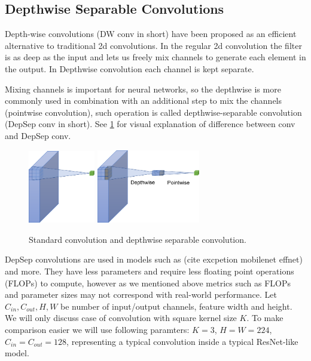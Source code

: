 \subsection{Depthwise Separable Convolutions}

Depth-wise convolutions (DW conv in short) have been proposed as an efficient alternative to traditional 2d convolutions. In the regular 2d convolution the filter is as deep as the input and lets us freely mix channels to generate each element in the output. In Depthwise convolution each channel is kept separate. 

Mixing channels is important for  neural networks, so the depthwise is more commonly used in combination with an additional step to mix the channels (pointwise convolution), such operation is called depthwise-separable convolution (DepSep conv in short). See \ref{fig: convs} for visual explanation of difference between conv and DepSep conv. 

\begin{figure}[h]
    \centering
         \includegraphics[width=0.26\textwidth]{images/conv.pdf}
         \hfil
         \includegraphics[width=0.4\textwidth]{images/conv_DepSep.pdf}
    \caption{Standard convolution and depthwise separable convolution.}   \label{fig: convs}
    \end{figure}


DepSep convolutions are used in models such as (cite excpetion mobilenet effnet) and more. They have less parameters and require less floating point operations (FLOPs) to compute, however as we mentioned above metrics such as FLOPs and parameter sizes may not correspond with real-world performance. Let $C_{in}, C_{out}, H, W$ be number of input/output channels, feature width and height. We will only discuss case of convolution with square kernel size $K$. To make comparison easier we will use following paramters: $K=3$, $H=W=224$, $C_{in} = C_{out}=128$, representing a typical convolution inside a typical ResNet-like model.  

